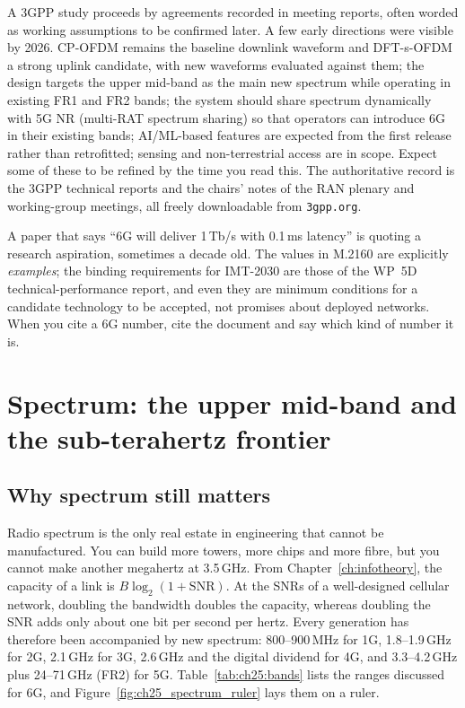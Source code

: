 \begin{inpractice}
A 3GPP study proceeds by agreements recorded in meeting reports, often worded as working
assumptions to be confirmed later. A few early directions were visible by 2026. CP-OFDM remains the
baseline downlink waveform and DFT-s-OFDM a strong uplink candidate, with new waveforms evaluated
against them; the design targets the upper mid-band as the main new spectrum while operating in
existing FR1 and FR2 bands; the system should share spectrum dynamically with 5G NR (multi-RAT
spectrum sharing) so that operators can introduce 6G in their existing bands; AI/ML-based features are
expected from the first release rather than retrofitted; sensing and non-terrestrial access are in
scope. Expect some of these to be refined by the time you read this. The authoritative record is the
3GPP technical reports and the chairs' notes of the RAN plenary and working-group meetings, all
freely downloadable from \texttt{3gpp.org}.
\end{inpractice}

\begin{pitfall}
A paper that says ``6G will deliver 1\,Tb/s with 0.1\,ms latency'' is quoting a research aspiration,
sometimes a decade old. The values in M.2160 are explicitly \emph{examples}; the binding requirements
for IMT-2030 are those of the WP~5D technical-performance report, and even they are minimum
conditions for a candidate technology to be accepted, not promises about deployed networks. When you
cite a 6G number, cite the document and say which kind of number it is.
\end{pitfall}

\section{Spectrum: the upper mid-band and the sub-terahertz frontier}
\label{sec:ch25:spectrum}

\subsection{Why spectrum still matters}

Radio spectrum is the only real estate in engineering that cannot be manufactured. You can build
more towers, more chips and more fibre, but you cannot make another megahertz at 3.5\,GHz. From
Chapter~\ref{ch:infotheory}, the capacity of a link is $B\log_2(1+\mathrm{SNR})$. At the SNRs of a
well-designed cellular network, doubling the bandwidth doubles the capacity, whereas doubling the
SNR adds only about one bit per second per hertz. Every generation has therefore been accompanied by
new spectrum: 800--900\,MHz for 1G, 1.8--1.9\,GHz for 2G, 2.1\,GHz for 3G, 2.6\,GHz and the digital
dividend for 4G, and 3.3--4.2\,GHz plus 24--71\,GHz (FR2) for 5G. Table~\ref{tab:ch25:bands} lists
the ranges discussed for 6G, and Figure~\ref{fig:ch25_spectrum_ruler} lays them on a ruler.


